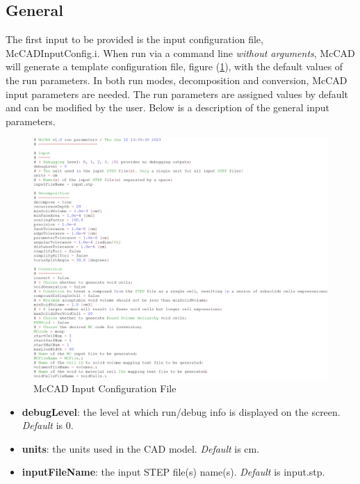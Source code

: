 \documentclass[12pt, a4paper, titlepage]{article}
\begin{document}
  \subsection{General}
	The first input to be provided is the input configuration file, McCADInputConfig.i.  When run via a command line \emph{without arguments}, McCAD will generate a template configuration file, figure (\ref{fig:config}), with the default values of the run parameters. In both run modes, decomposition and conversion, McCAD input parameters are needed. The run parameters are assigned values by default and can be modified by the user. Below is a description of the general input parameters.
	\begin{figure}[h!]
		\centering
		\includegraphics[scale=0.4]{figures/configFile.png}
		\caption{McCAD Input Configuration File}
		\label{fig:config}
	\end{figure}
	\begin{itemize}
		\item \textbf{debugLevel}: the level at which run/debug info is displayed on the screen. \emph{Default} is 0.
		\item \textbf{units}: the units used in the CAD model. \emph{Default} is cm.
		\item \textbf{inputFileName}: the input STEP file(s) name(s). \emph{Default} is input.stp.
	\end{itemize}
\end{document}
